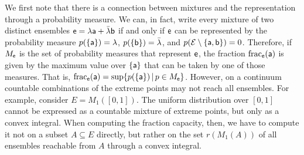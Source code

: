 We first note that there is a connection between mixtures and the representation through a probability measure. We can, in fact, write every mixture of two distinct ensembles $\ens = \lambda \ens[a] + \bar{\lambda} \ens[b]$ if and only if $\ens$ can be represented by the probability measure $p(\{\ens[a]\}) = \lambda$, $p(\{\ens[b]\}) = \bar{\lambda}$, and $p(\Ens \setminus \{\ens[a], \ens[b]\}) = 0$. Therefore, if $M_{\ens}$ is the set of probability measures that represent $\ens$, the fraction $\fraction_{\ens}(\ens[a])$ is given by the maximum value over $\{\ens[a]\}$ that can be taken by one of those measures. That is,  $\fraction_{\ens}(\ens[a]) = \sup \{ p(\{\ens[a]\}) \, | \, p \in M_{\ens} \}$. However, on a continuum countable combinations of the extreme points may not reach all ensembles. For example, consider $E = M_1([0,1])$. The uniform distribution over $[0,1]$ cannot be expressed as a countable mixture of extreme points, but only as a convex integral. When computing the fraction capacity, then, we have to compute it not on a subset $A \subseteq E$ directly, but rather on the set $r(M_1(A))$ of all ensembles reachable from $A$ through a convex integral.

